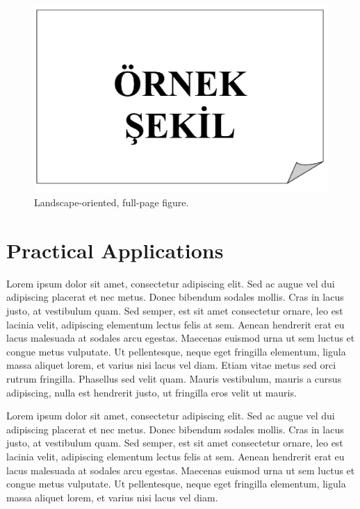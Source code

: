 \begin{landscape}
	\thispagestyle{empty}
	\begin{figure}
		\centering
		\includegraphics[width=700pt,keepaspectratio=true]{./fig/sekil3}
		\caption{Landscape-oriented, full-page figure.}    
		\vspace{3cm}
		\hspace{0cm}\pageref{fig:cshapeMapVMAT}
		\label{fig:cshapeMapVMAT}
	\end{figure}
\end{landscape}

\section{Practical Applications}

Lorem ipsum dolor sit amet, consectetur adipiscing elit. Sed ac augue vel dui 
adipiscing placerat et nec metus. Donec bibendum sodales mollis. Cras in lacus 
justo, at vestibulum quam. Sed semper, est sit amet consectetur ornare, leo est 
lacinia velit, adipiscing elementum lectus felis at sem. Aenean hendrerit erat eu 
lacus malesuada at sodales arcu egestas. Maecenas euismod urna ut sem luctus et 
congue metus vulputate. Ut pellentesque, neque eget fringilla elementum, ligula 
massa aliquet lorem, et varius nisi lacus vel diam. Etiam vitae metus sed orci 
rutrum fringilla. Phasellus sed velit quam. Mauris vestibulum, mauris a cursus 
adipiscing, nulla est hendrerit justo, ut fringilla eros velit ut mauris.

Lorem ipsum dolor sit amet, consectetur adipiscing elit. Sed ac augue vel dui 
adipiscing placerat et nec metus. Donec bibendum sodales mollis. Cras in lacus 
justo, at vestibulum quam. Sed semper, est sit amet consectetur ornare, leo est 
lacinia velit, adipiscing elementum lectus felis at sem. Aenean hendrerit erat eu 
lacus malesuada at sodales arcu egestas. Maecenas euismod urna ut sem luctus et 
congue metus vulputate. Ut pellentesque, neque eget fringilla elementum, ligula 
massa aliquet lorem, et varius nisi lacus vel diam.

